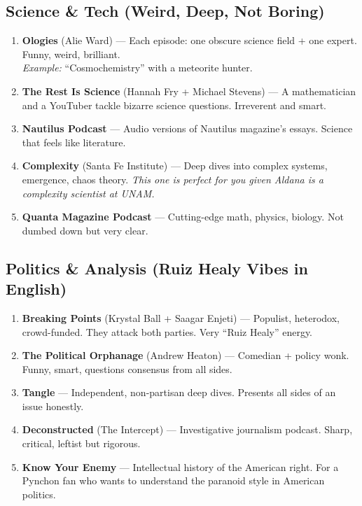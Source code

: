 \documentclass[11pt,a4paper]{article}
\begin{document}
\subsection{Science \& Tech (Weird, Deep, Not Boring)}
\begin{enumerate}[label=\textbf{\arabic*.}]
    \item \textbf{Ologies} (Alie Ward) --- Each episode: one obscure science 
          field + one expert. Funny, weird, brilliant. \\
          \emph{Example:} ``Cosmochemistry'' with a meteorite hunter.
    \item \textbf{The Rest Is Science} (Hannah Fry + Michael Stevens) --- 
          A mathematician and a YouTuber tackle bizarre science questions. 
          Irreverent and smart.
    \item \textbf{Nautilus Podcast} --- Audio versions of Nautilus magazine's 
          essays. Science that feels like literature.
    \item \textbf{Complexity} (Santa Fe Institute) --- Deep dives into complex 
          systems, emergence, chaos theory. \emph{This one is perfect for you 
          given Aldana is a complexity scientist at UNAM.}
    \item \textbf{Quanta Magazine Podcast} --- Cutting-edge math, physics, 
          biology. Not dumbed down but very clear.
\end{enumerate}

\subsection{Politics \& Analysis (Ruiz Healy Vibes in English)}
\begin{enumerate}[label=\textbf{\arabic*.}]
    \item \textbf{Breaking Points} (Krystal Ball + Saagar Enjeti) --- 
          Populist, heterodox, crowd-funded. They attack both parties. 
          Very ``Ruiz Healy'' energy.
    \item \textbf{The Political Orphanage} (Andrew Heaton) --- Comedian + 
          policy wonk. Funny, smart, questions consensus from all sides.
    \item \textbf{Tangle} --- Independent, non-partisan deep dives. 
          Presents all sides of an issue honestly.
    \item \textbf{Deconstructed} (The Intercept) --- Investigative journalism 
          podcast. Sharp, critical, leftist but rigorous.
    \item \textbf{Know Your Enemy} --- Intellectual history of the American 
          right. For a Pynchon fan who wants to understand the paranoid style 
          in American politics.
\end{enumerate}
\end{document}
